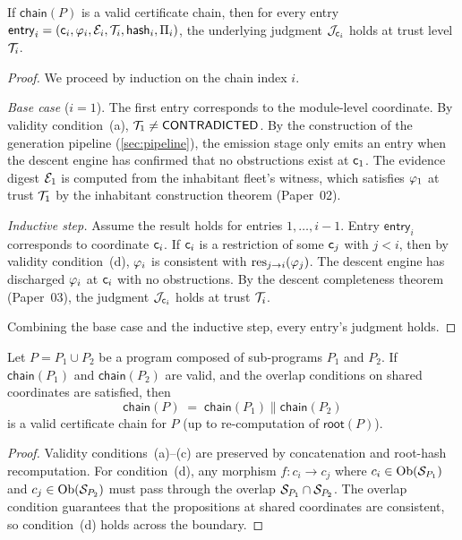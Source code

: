 \documentclass[11pt]{article}
\newcommand{\certchain}{\mathsf{chain}}
\newcommand{\certhash}{\mathsf{hash}}
\newcommand{\certentry}{\mathsf{entry}}
\newcommand{\certroot}{\mathsf{root}}
\begin{document}
\begin{theorem}\label{thm:soundness}
If $\certchain(P)$ is a valid certificate chain, then for every
entry $\certentry_i = (\coord_i, \prop_i, \evid_i, \trust_i,
\certhash_i, \prov_i)$, the underlying judgment
$\mathcal{J}_{\mathsf{c}_i}$ holds at trust level $\mathcal{T}_i$.
\end{theorem}

\begin{proof}
We proceed by induction on the chain index $i$.

\emph{Base case} ($i = 1$).  The first entry corresponds to the
module-level coordinate.  By validity condition~(a), $\mathcal{T}_1 \neq
\mathsf{CONTRADICTED}$.  By the construction of the generation pipeline
(\cref{sec:pipeline}), the emission stage only emits an entry when
the descent engine has confirmed that no obstructions exist at
$\mathsf{c}_1$.  The evidence digest $\mathcal{E}_1$ is computed from the
inhabitant fleet's witness, which satisfies $\varphi_1$ at trust
$\mathcal{T}_1$ by the inhabitant construction theorem (Paper~02).

\emph{Inductive step.}  Assume the result holds for entries
$1, \ldots, i-1$.  Entry $\certentry_i$ corresponds to coordinate
$\mathsf{c}_i$.  If $\mathsf{c}_i$ is a restriction of some $\mathsf{c}_j$
with $j < i$, then by validity condition~(d), $\varphi_i$ is
consistent with $\mathrm{res}_{j \to i}(\varphi_j)$.  The descent engine
has discharged $\varphi_i$ at $\mathsf{c}_i$ with no obstructions.  By
the descent completeness theorem (Paper~03), the judgment
$\mathcal{J}_{\mathsf{c}_i}$ holds at trust $\mathcal{T}_i$.

Combining the base case and the inductive step, every entry's
judgment holds.
\end{proof}

\begin{theorem}\label{thm:compositionality}
Let $P = P_1 \cup P_2$ be a program composed of sub-programs $P_1$
and $P_2$.  If $\certchain(P_1)$ and $\certchain(P_2)$ are valid,
and the overlap conditions on shared coordinates are satisfied, then
\[
  \certchain(P) \;=\; \certchain(P_1) \mathbin\| \certchain(P_2)
\]
is a valid certificate chain for $P$ (up to re-computation of
$\certroot(P)$).
\end{theorem}

\begin{proof}
Validity conditions~(a)--(c) are preserved by concatenation and
root-hash recomputation.  For condition~(d), any morphism
$f : c_i \to c_j$ where $c_i \in \mathrm{Ob}(\mathcal{S}_{P_1})$ and
$c_j \in \mathrm{Ob}(\mathcal{S}_{P_2})$ must pass through the overlap
$\mathcal{S}_{P_1} \cap \mathcal{S}_{P_2}$.  The overlap condition
guarantees that the propositions at shared coordinates are
consistent, so condition~(d) holds across the boundary.
\end{proof}
\end{document}
